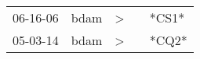 \begin{supertabular}{p{0.07\textwidth}p{0.06\textwidth}p{0.02\textwidth}p{0.02\textwidth}p{0.06\textwidth}}
 06-16-06\textsuperscript{} &  bdam\textsuperscript{} &  \textgreater &   &  *CS1* \\
 05-03-14\textsuperscript{} &  bdam\textsuperscript{} &  \textgreater &   &  *CQ2* \\
\end{supertabular}

